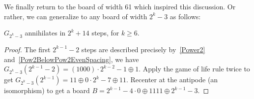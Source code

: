 \documentclass[12pt,letterpaper]{article}
\begin{document}
We finally return to the board of width 61 which inspired this discussion. Or rather, we can generalize to any board of width $2^k-3$ as follows:
\begin{prop}\label{pow2-3annihilates}
  $G_{2^k-3}$ annihilates in $2^k+14$ steps, for $k\geq 6$. 
\end{prop}
\begin{proof}
  The first $2^{k-1}-2$ steps are described precisely by~\cref{Power2} and~\cref{Pow2BelowPow2EvenSpacing}, we have $G_{2^k-3}(2^{k-1}-2)=(1000)\cdot 2^{k-2}-1\oplus 1$. Apply the game of life rule twice to get $G_{2^k-3}(2^{k-1})=11\oplus 0\cdot 2^{k}-7\oplus 11$. Recenter at the antipode (an isomorphism) to get a board $B=2^{k-1}-4\cdot 0\oplus 1111\oplus 2^{k-1}-3$. 
\end{proof}
\end{document}
